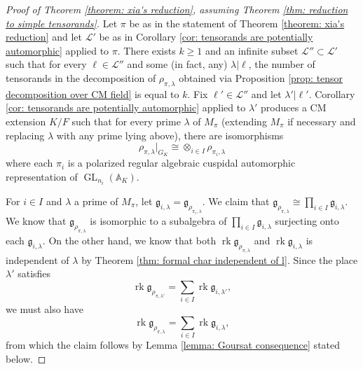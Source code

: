 \documentclass{amsart}
\theoremstyle{definition}
\numberwithin{equation}{section} %
\newcommand{\GL}{\operatorname{GL}}
\newcommand{\rk}{\operatorname{rk}}
\newcommand{\bb}[1]{\mathbb{#1}}
\newcommand{\mc}[1]{\mathcal{#1}}
\newcommand{\mf}[1]{\mathfrak{#1}}
\begin{document}
\begin{proof}[Proof of Theorem \ref{theorem: xia's reduction}, assuming Theorem \ref{thm: reduction to simple tensorands}]
Let $\pi$ be as in the statement of Theorem \ref{theorem: xia's reduction} and let $\mc{L}'$ be as in Corollary \ref{cor: tensorands are potentially automorphic} applied to $\pi$.
There exists $k \geq 1$ and an infinite subset $\mc{L}'' \subset \mc{L}'$ such that for every $\ell \in \mc{L}''$ and some (in fact, any) $\lambda|\ell$, the number of tensorands in the decomposition of $\rho_{\pi,\lambda}$ obtained via Proposition \ref{prop: tensor decomposition over CM field} is equal to $k$.
Fix $\ell' \in \mc{L}''$ and let $\lambda' | \ell'$.
Corollary \ref{cor: tensorands are potentially automorphic} applied to \( \lambda' \) produces a CM extension $K/F$ such that for every prime $\lambda$ of $M_\pi$ (extending $M_\pi$ if necessary and replacing $\lambda$ with any prime lying above), there are isomorphisms
\[
\rho_{\pi,\lambda}|_{G_K} \cong \otimes_{i \in I} \rho_{\pi_i,\lambda}
\]
where each $\pi_i$ is a polarized regular algebraic cuspidal automorphic representation of $\GL_{n_i}(\bb{A}_K)$.

For $i \in I$ and $\lambda$ a prime of $M_\pi$, let $\mf{g}_{i,\lambda} = \mf{g}_{\rho_{\pi_i,\lambda}}$.
We claim that $\mf{g}_{\rho_{\pi,\lambda}} \cong \prod_{i \in I} \mf{g}_{i,\lambda}$.
We know that $\mf{g}_{\rho_{\pi,\lambda}}$ is isomorphic to a subalgebra of $\prod_{i \in I} \mf{g}_{i,\lambda}$ surjecting onto each $\mf{g}_{i,\lambda}$.
On the other hand, we know that both $\rk \mf{g}_{\rho_{\pi,\lambda}}$ and $\rk \mf{g}_{i,\lambda}$ is independent of $\lambda$ by Theorem \ref{thm: formal char independent of l}.
Since the place $\lambda'$ satisfies
\[
\rk \mf{g}_{\rho_{\pi,\lambda'}} = \sum_{i \in I} \rk \mf{g}_{i,\lambda'},
\]
we must also have
\[
\rk \mf{g}_{\rho_{\pi,\lambda}} = \sum_{i \in I} \rk \mf{g}_{i,\lambda},
\]
from which the claim follows by Lemma \ref{lemma: Goursat consequence} stated below.


\end{proof}
\end{document}
